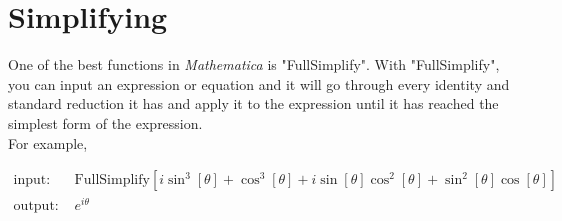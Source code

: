 \documentclass[11pt,letterpaper,twoside,titlepage]{report}
\newcommand{\Mathematica}{\textit{Mathematica} }
\begin{document}
\begin{itemize}
%						
%				
%						
%						
%						
%						
%						
%						
						
				\end{itemize}
				
		\chapter{Simplifying}
						
			One of the best functions in \Mathematica is "FullSimplify".  With "FullSimplify", you can input an expression or equation and it will go through every identity and standard reduction it has and apply it to the expression until it has reached the simplest form of the expression. \\
						
			For example,
						
			\begin{align*}
				\text{input: }& \text{FullSimplify}\left[i \sin ^3[\theta ]+\cos ^3[\theta ]+i \sin [\theta ] \cos ^2[\theta ]+\sin ^2[\theta ] \cos [\theta ]\right] \\
				\text{output: }& e^{ i \theta }
			\end{align*}
						
\end{document}

